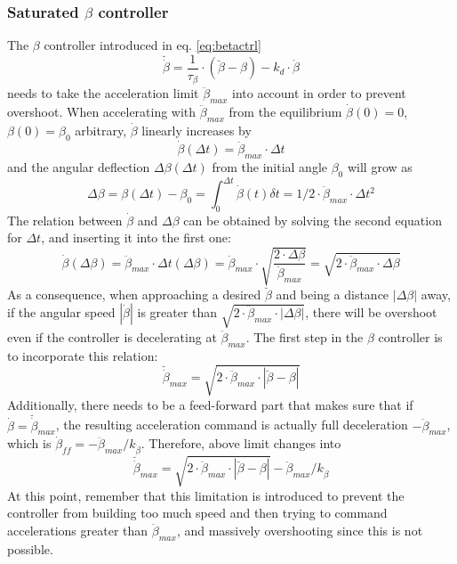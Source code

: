 \documentclass{article}
\begin{document}
\subsubsection{Saturated \texorpdfstring{$\beta$}{beta} controller}
The $\beta$ controller introduced in eq. \ref{eq:betactrl}
\[
\breve{\dot{\beta}} = \frac{1}{\tau_{\beta}} \cdot \left( \breve{\beta} - \beta \right) - k_d \cdot \dot{\beta}
\]
needs to take the acceleration limit $\ddot{\beta}_{max}$ into account in order to prevent overshoot.
When accelerating with $\ddot{\beta}_{max}$ from the equilibrium $\dot{\beta}(0) = 0$, $\beta(0) = \beta_0$ arbitrary, $\dot{\beta}$ linearly increases by
\[
\dot{\beta}(\Delta t) = \ddot{\beta}_{max} \cdot \Delta t
\]
and the angular deflection $\Delta \beta(\Delta t)$ from the initial angle $\beta_0$ will grow as
\[
\Delta \beta = \beta(\Delta t) - \beta_0 = \int_0^{\Delta t}{\dot{\beta}(t) \delta t} = 1/2 \cdot \ddot{\beta}_{max} \cdot \Delta t^2
\]
The relation between $\dot{\beta}$ and $\Delta \beta$ can be obtained by solving the second equation for $\Delta t$, and inserting it into the first one:
\begin{equation}
\dot{\beta}(\Delta \beta) = \ddot{\beta}_{max} \cdot \Delta t(\Delta \beta) = \ddot{\beta}_{max} \cdot \sqrt{\frac{2 \cdot \Delta \beta}{\ddot{\beta}_{max}}} = \sqrt{2 \cdot \ddot{\beta}_{max} \cdot \Delta \beta }
\end{equation}
As a consequence, when approaching a desired $\breve{\beta}$ and being a distance $|\Delta \beta|$ away, if the angular speed $|\dot{\beta}|$ is greater than $\sqrt{2 \cdot \ddot{\beta}_{max} \cdot |\Delta \beta|}$, there will be overshoot even if the controller is decelerating at $\ddot{\beta}_{max}$.
The first step in the $\beta$ controller is to incorporate this relation:
\begin{equation}
\breve{\dot{\beta}}_{max} = \sqrt{2 \cdot \ddot{\beta}_{max} \cdot |\breve{\beta} - \beta|}
\end{equation}
Additionally, there needs to be a feed-forward part that makes sure that if $\dot{\beta} = \breve{\dot{\beta}}_{max}$, the resulting acceleration command is actually full deceleration $-\ddot{\beta}_{max}$, which is $\dot{\beta}_{ff} = -\ddot{\beta}_{max} / k_{\dot{\beta}}$.
Therefore, above limit changes into
\begin{equation}
\breve{\dot{\beta}}_{max} = \sqrt{2 \cdot \ddot{\beta}_{max} \cdot |\breve{\beta} - \beta|} - \ddot{\beta}_{max} / k_{\dot{\beta}}
\end{equation}
At this point, remember that this limitation is introduced to prevent the controller from building too much speed and then trying to command accelerations greater than $\ddot{\beta}_{max}$, and massively overshooting since this is not possible.
\end{document}
